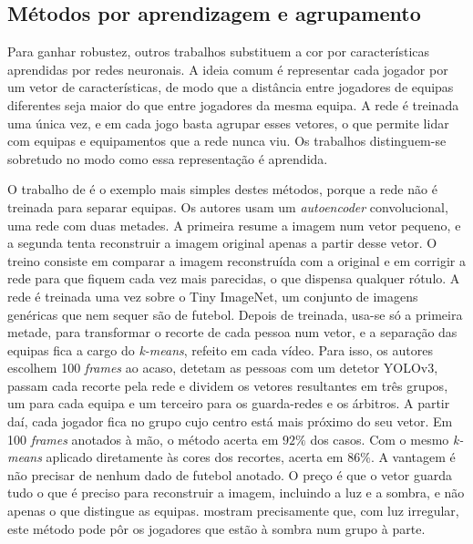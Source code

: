 \subsection{Métodos por aprendizagem e agrupamento}

Para ganhar robustez, outros trabalhos substituem a cor por características aprendidas por redes neuronais. A ideia comum é representar cada jogador por um vetor de características, de modo que a distância entre jogadores de equipas diferentes seja maior do que entre jogadores da mesma equipa. A rede é treinada uma única vez, e em cada jogo basta agrupar esses vetores, o que permite lidar com equipas e equipamentos que a rede nunca viu. Os trabalhos distinguem-se sobretudo no modo como essa representação é aprendida.

O trabalho de \citet{alhejaily2023team} é o exemplo mais simples destes métodos, porque a rede não é treinada para separar equipas. Os autores usam um \emph{autoencoder} convolucional, uma rede com duas metades. A primeira resume a imagem num vetor pequeno, e a segunda tenta reconstruir a imagem original apenas a partir desse vetor. O treino consiste em comparar a imagem reconstruída com a original e em corrigir a rede para que fiquem cada vez mais parecidas, o que dispensa qualquer rótulo. A rede é treinada uma vez sobre o Tiny ImageNet, um conjunto de imagens genéricas que nem sequer são de futebol. Depois de treinada, usa-se só a primeira metade, para transformar o recorte de cada pessoa num vetor, e a separação das equipas fica a cargo do \emph{k-means}, refeito em cada vídeo. Para isso, os autores escolhem 100 \emph{frames} ao acaso, detetam as pessoas com um detetor YOLOv3, passam cada recorte pela rede e dividem os vetores resultantes em três grupos, um para cada equipa e um terceiro para os guarda-redes e os árbitros. A partir daí, cada jogador fica no grupo cujo centro está mais próximo do seu vetor. Em 100 \emph{frames} anotados à mão, o método acerta em $92\%$ dos casos. Com o mesmo \emph{k-means} aplicado diretamente às cores dos recortes, acerta em $86\%$. A vantagem é não precisar de nenhum dado de futebol anotado. O preço é que o vetor guarda tudo o que é preciso para reconstruir a imagem, incluindo a luz e a sombra, e não apenas o que distingue as equipas. \citet{pan2024unsupervised} mostram precisamente que, com luz irregular, este método pode pôr os jogadores que estão à sombra num grupo à parte.

